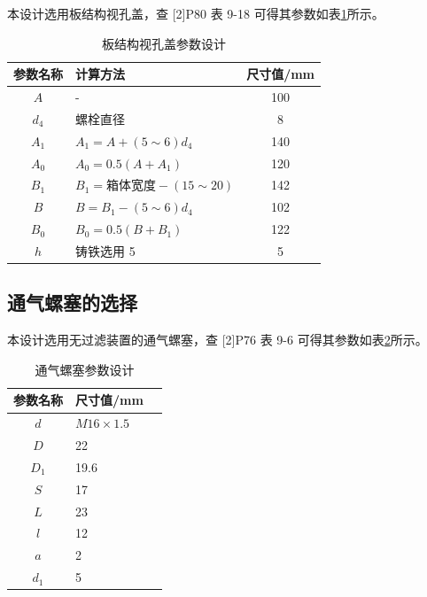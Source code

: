 \documentclass[12pt]{ctexart}
\begin{document}
本设计选用板结构视孔盖，查 [2]P80 表 9-18 可得其参数如表\ref{table19}所示。
\begin{table}[htbp]
    \centering
    \setlength{\belowcaptionskip}{0.3cm}
    \caption{板结构视孔盖参数设计}
    \begin{tabular}{c l c}
        \toprule
        参数名称  & 计算方法 & 尺寸值/mm \\
        \midrule
        $A$   &  -       &100\\
        $d_4$ &  螺栓直径 &8 \\
        $A_1$ &  $A_1 = A+(5\sim 6)d_4$ &140 \\
        $A_0$ & $A_0=0.5(A+A_1)$       & 120\\
        $B_1$ & $B_1=\text{箱体宽度}-(15\sim 20)$ & 142 \\
        $B$  & $B=B_1-(5\sim 6)d_4$    & 102\\
        $B_0$& $B_0=0.5(B+B_1)$        & 122\\
        $h$  & 铸铁选用 5              & 5 \\
        \bottomrule
    \end{tabular}
    
    \label{table19}
\end{table}

\subsection{通气螺塞的选择}

本设计选用无过滤装置的通气螺塞，查 [2]P76 表 9-6 可得其参数如表\ref{table20}所示。

\begin{table}[htbp]
    \centering
    \setlength{\belowcaptionskip}{0.3cm}
    \caption{通气螺塞参数设计}
    \begin{tabular}{c l c}
        \toprule
        参数名称  &  尺寸值/mm \\
        \midrule
        $d$      &  $M16\times 1.5$ \\
        $D$      &  22 \\
        $D_1$    &  19.6 \\
        $S$      &  17 \\
        $L$      &  23 \\
        $l$      &  12 \\
        $a$      &  2  \\
        $d_1$    &  5 \\
        \bottomrule
    \end{tabular}
    
    \label{table20}
\end{table}
\end{document}
